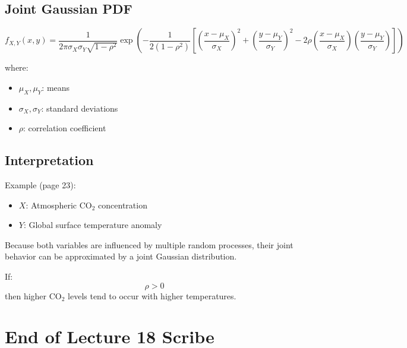 \documentclass[12pt]{article}
\begin{document}
\subsection{Joint Gaussian PDF}

\[
f_{X,Y}(x,y) =
\frac{1}{2\pi \sigma_X \sigma_Y \sqrt{1 - \rho^2}}
\exp\left(
-\frac{1}{2(1 - \rho^2)}
\left[
\left(\frac{x - \mu_X}{\sigma_X}\right)^2
+
\left(\frac{y - \mu_Y}{\sigma_Y}\right)^2
-
2\rho
\left(\frac{x - \mu_X}{\sigma_X}\right)
\left(\frac{y - \mu_Y}{\sigma_Y}\right)
\right]
\right)
\]

where:
\begin{itemize}
    \item $\mu_X, \mu_Y$: means
    \item $\sigma_X, \sigma_Y$: standard deviations
    \item $\rho$: correlation coefficient
\end{itemize}

\subsection{Interpretation}

Example (page 23):

\begin{itemize}
    \item $X$: Atmospheric CO$_2$ concentration
    \item $Y$: Global surface temperature anomaly
\end{itemize}

Because both variables are influenced by multiple random processes, their joint behavior can be approximated by a joint Gaussian distribution.

If:
\[
\rho > 0
\]
then higher CO$_2$ levels tend to occur with higher temperatures.

\section*{End of Lecture 18 Scribe}
\end{document}
